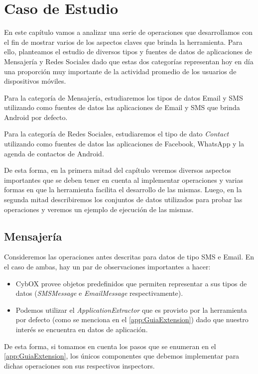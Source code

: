 \chapter{Caso de Estudio} \label{chap:CasoDeEstudio}
En este capítulo vamos a analizar una serie de operaciones que desarrollamos con el fin de mostrar varios de los aspectos claves que brinda la herramienta. Para ello, planteamos el estudio de diversos tipos y fuentes de datos de aplicaciones de Mensajería y Redes Sociales dado que estas dos categorías representan hoy en día una proporción muy importante de la actividad promedio de los usuarios de dispositivos móviles.

Para la categoría de Mensajería, estudiaremos los tipos de datos Email y SMS utilizando como fuentes de datos las aplicaciones de Email y SMS que brinda Android por defecto.

Para la categoría de Redes Sociales, estudiaremos el tipo de dato \emph{Contact} utilizando como fuentes de datos las aplicaciones de Facebook, WhatsApp y la agenda de contactos de Android.

De esta forma, en la primera mitad del capítulo veremos diversos aspectos importantes que se deben tener en cuenta al implementar operaciones y varias formas en que la herramienta facilita el desarrollo de las mismas. Luego, en la segunda mitad describiremos los conjuntos de datos utilizados para probar las operaciones y veremos un ejemplo de ejecución de las mismas.

\section{Mensajería}
Consideremos las operaciones antes descritas para datos de tipo SMS e Email. En el caso de ambas, hay un par de observaciones importantes a hacer:
\begin{itemize}
\item CybOX provee objetos predefinidos que permiten representar a sus tipos de datos (\emph{SMSMessage} e \emph{EmailMessage} respectivamente).
\item Podemos utilizar el \emph{ApplicationExtractor} que es provisto por la herramienta por defecto (como se menciona en el \autoref{app:GuiaExtension}) dado que nuestro interés se encuentra en datos de aplicación.
\end{itemize}

De esta forma, si tomamos en cuenta los pasos que se enumeran en el \autoref{app:GuiaExtension}, los únicos componentes que debemos implementar para dichas operaciones son sus respectivos inspectors.

